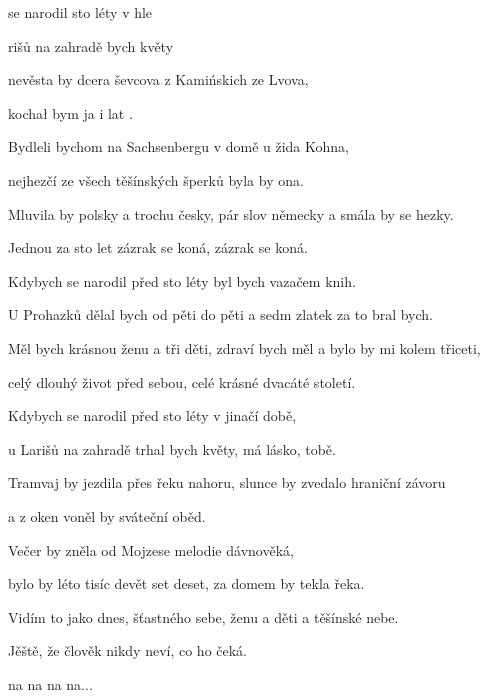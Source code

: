 

\zs
{} se narodil  sto léty
 v hle     

rišů na zahradě  bych květy 
    

 nevěsta by  dcera ševcova
z  Kamińskich  ze Lvova,

kochał bym ja i   lat .
\ks

\zs
Bydleli bychom na Sachsenbergu v domě u žida Kohna,

nejhezčí ze všech těšínských šperků byla by ona.

Mluvila by polsky a trochu česky,
pár slov německy a smála by se hezky.

Jednou za sto let zázrak se koná, zázrak se koná.
\ks

\zs
Kdybych se narodil před sto léty byl bych vazačem knih.

U Prohazků dělal bych od pěti do pěti a sedm zlatek za to bral bych.

Měl bych krásnou ženu a tři děti,
zdraví bych měl a bylo by mi kolem třiceti,

celý dlouhý život před sebou, celé krásné dvacáté století.
\ks

\zs
Kdybych se narodil před sto léty v jinačí době,

u Larišů na zahradě trhal bych květy, má lásko, tobě.

Tramvaj by jezdila přes řeku nahoru,
slunce by zvedalo hraniční závoru

a z oken voněl by sváteční oběd.
\ks

\zs
Večer by zněla od Mojzese melodie dávnověká,

bylo by léto tisíc devět set deset, za domem by tekla řeka.

Vidím to jako dnes, šťastného sebe,
ženu a děti a těšínské nebe.

Jěště, že člověk nikdy neví, co ho čeká.

na na na na...
\ks

\kp





